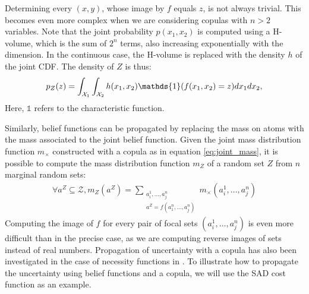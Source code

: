 Determining every $(x,y)$, whose image by $f$ equals $z$, is not always trivial. This becomes even more complex when we are considering copulas with $n>2$ variables. Note that the joint probability $p(x_1,x_2)$ is computed using a H-volume, which is the sum of $2^n$ terms, also increasing exponentially with the dimension. In the continuous case, the H-volume is replaced with the density $h$ of the joint CDF. The density of $Z$ is thus:
\begin{align}
    p_Z(z) = \int_{\X_1}\int_{\X_2}h(x_1,x_2)\mathds{1}(f(x_1,x_2)=z)dx_1dx_2,
\end{align}
Here, $\mathds{1}$ refers to the characteristic function.

Similarly, belief functions can be propagated by replacing the mass on atoms with the mass associated to the joint belief function. Given the joint mass distribution function $m_\times$ constructed with a copula as in equation \eqref{eq:joint_mass}, it is possible to compute the mass distribution function $m_Z$ of a random set $Z$ from $n$ marginal random sets:
\begin{align}
    \forall a^Z\subseteq\mathcal{Z}, m_Z(a^Z) = \sum_{\substack{a^1_i, \dots, a^n_j\\a^Z=f(a^n_1,\dots, a^n_j)}}m_\times(a^1_i, \dots, a^n_j)\label{eq:mass_propagated}
\end{align}
Computing the image of $f$ for every pair of focal sets $(a^1_i, \dots, a^n_j)$ is even more difficult than in the precise case, as we are computing reverse images of sets instead of real numbers. Propagation of uncertainty with a copula has also been investigated in the case of necessity functions in \cite{gray_dependent_2021}. To illustrate how to propagate the uncertainty using belief functions and a copula, we will use the SAD cost function as an example.

